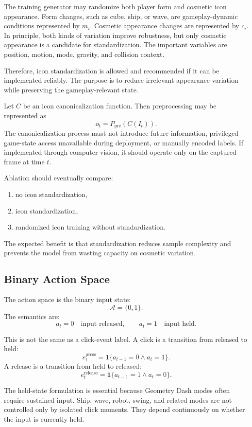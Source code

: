 \documentclass[11pt]{article}
\newcommand{\Ppre}{P_{\mathrm{pre}}}
\newcommand{\indicator}[1]{\mathbf{1}\{#1\}}
\begin{document}
The training generator may randomize both player form and cosmetic icon appearance. Form changes, such as cube, ship, or wave, are gameplay-dynamic conditions represented by \(m_i\). Cosmetic appearance changes are represented by \(c_i\). In principle, both kinds of variation improve robustness, but only cosmetic appearance is a candidate for standardization. The important variables are position, motion, mode, gravity, and collision context.

Therefore, icon standardization is allowed and recommended if it can be implemented reliably. The purpose is to reduce irrelevant appearance variation while preserving the gameplay-relevant state.

Let \(C\) be an icon canonicalization function. Then preprocessing may be represented as
\[
  o_t = \Ppre(C(I_t)).
\]
The canonicalization process must not introduce future information, privileged game-state access unavailable during deployment, or manually encoded labels. If implemented through computer vision, it should operate only on the captured frame at time \(t\).

Ablation should eventually compare:
\begin{enumerate}
  \item no icon standardization,
  \item icon standardization,
  \item randomized icon training without standardization.
\end{enumerate}

The expected benefit is that standardization reduces sample complexity and prevents the model from wasting capacity on cosmetic variation.

\subsection{Binary Action Space}

The action space is the binary input state:
\[
  \mathcal{A} = \{0,1\}.
\]
The semantics are:
\[
  a_t = 0 \quad \text{input released},
  \qquad
  a_t = 1 \quad \text{input held}.
\]

This is not the same as a click-event label. A click is a transition from released to held:
\[
  e_t^{\mathrm{press}} = \indicator{a_{t-1}=0 \wedge a_t=1}.
\]
A release is a transition from held to released:
\[
  e_t^{\mathrm{release}} = \indicator{a_{t-1}=1 \wedge a_t=0}.
\]

The held-state formulation is essential because Geometry Dash modes often require sustained input. Ship, wave, robot, swing, and related modes are not controlled only by isolated click moments. They depend continuously on whether the input is currently held.
\end{document}
